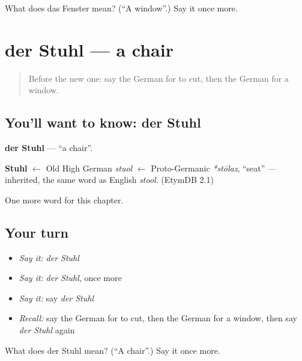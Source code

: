 \begin{tcolorbox}[breakable,colback=teal!4,colframe=teal!35!black,title={Before you move on}]
What does das Fenster mean? (\textquotedblleft{}A window\textquotedblright{}.) Say it once more.
\end{tcolorbox}
\section[der Stuhl]{der Stuhl — a chair}

\label{lesson:GE-C76-stuhl}



\begin{quote}
Before the new one: say the German for to cut, then the German for a window.
\end{quote}

\subsection*{You'll want to know: der Stuhl}
\textbf{der Stuhl} — \textquotedblleft{}a chair\textquotedblright{}.

\begin{cousinweb}
\textbf{Stuhl} $\leftarrow$ Old High German \emph{stuol} $\leftarrow$ Proto-Germanic \emph{*stōlaz}, \textquotedblleft{}seat\textquotedblright{} — inherited, the same word as English \emph{stool}. (EtymDB 2.1)
\end{cousinweb}

\begin{grammarlens}[title={What you've built}]
One more word for this chapter.
\end{grammarlens}

\subsection*{Your turn}
\begin{itemize}
\raggedright
  \item \emph{Say it:} \emph{der Stuhl}
  \item \emph{Say it:} \emph{der Stuhl}, once more
  \item \emph{Say it:} say \emph{der Stuhl}
  \item \emph{Recall:} say the German for to cut, then the German for a window, then say \emph{der Stuhl} again
\end{itemize}

\begin{tcolorbox}[breakable,colback=teal!4,colframe=teal!35!black,title={Before you move on}]
What does der Stuhl mean? (\textquotedblleft{}A chair\textquotedblright{}.) Say it once more.
\end{tcolorbox}
